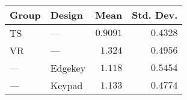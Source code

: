 \begin{tabular}{llrr}
\toprule
Group &   Design &     Mean &  Std. Dev. \\
\midrule
   TS &      --- & $0.9091$ &   $0.4328$ \\
   VR &      --- &  $1.324$ &   $0.4956$ \\
  --- &  Edgekey &  $1.118$ &   $0.5454$ \\
  --- &   Keypad &  $1.133$ &   $0.4774$ \\
\bottomrule
\end{tabular}
